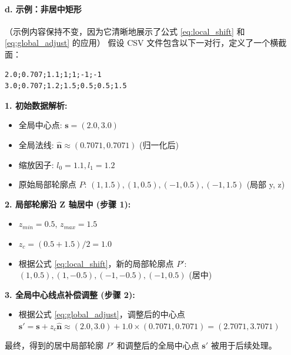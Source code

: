 \documentclass{ctexart}
\begin{document}
\paragraph{d. 示例：非居中矩形} （示例内容保持不变，因为它清晰地展示了公式 \eqref{eq:local_shift} 和 \eqref{eq:global_adjust} 的应用）
假设 CSV 文件包含以下一对行，定义了一个横截面：
\begin{verbatim}
2.0;0.707;1.1;1;1;-1;-1
3.0;0.707;1.2;1.5;0.5;0.5;1.5
\end{verbatim}
\textbf{1. 初始数据解析:}
\begin{itemize}
    \item 全局中心点: \( \mathbf{s} = (2.0, 3.0) \)
    \item 全局法线: \( \hat{\mathbf{n}} \approx (0.7071, 0.7071) \) (归一化后)
    \item 缩放因子: \( l_0 = 1.1, l_1 = 1.2 \)
    \item 原始局部轮廓点 \( P \): \( (1, 1.5), (1, 0.5), (-1, 0.5), (-1, 1.5) \) (局部 y, z)
\end{itemize}
\textbf{2. 局部轮廓沿 Z 轴居中 (步骤 1):}
\begin{itemize}
    \item \( z_{min} = 0.5 \), \( z_{max} = 1.5 \)
    \item \( z_c = (0.5 + 1.5) / 2 = 1.0 \)
    \item 根据公式 \eqref{eq:local_shift}，新的局部轮廓点 \( P' \): \( (1, 0.5), (1, -0.5), (-1, -0.5), (-1, 0.5) \) (居中)
\end{itemize}
\textbf{3. 全局中心线点补偿调整 (步骤 2):}
\begin{itemize}
    \item 根据公式 \eqref{eq:global_adjust}，调整后的中心点 \( \mathbf{s}' = \mathbf{s} + z_c \hat{\mathbf{n}} \approx (2.0, 3.0) + 1.0 \times (0.7071, 0.7071) = (2.7071, 3.7071) \)
\end{itemize}
最终，得到的居中局部轮廓 \( P' \) 和调整后的全局中心点 \( \mathbf{s}' \) 被用于后续处理。
\end{document}
